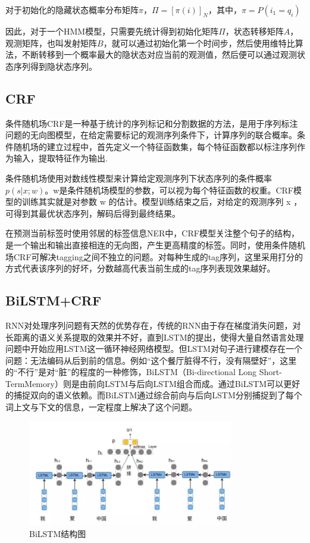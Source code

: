 \documentclass[a4paper, 12pt]{article}
\begin{document}
对于初始化的隐藏状态概率分布矩阵$\pi$，$\Pi = \left[ \pi(i) \right]_N$，其中，$\pi = P(i_1 = q_i)$

因此，对于一个HMM模型，只需要先统计得到初始化矩阵$\Pi$，状态转移矩阵$A$，观测矩阵，也叫发射矩阵$B$，就可以通过初始化第一个时间步，然后使用维特比算法，不断转移到一个概率最大的隐状态对应当前的观测值，然后便可以通过观测状态序列得到隐状态序列。


\subsection{CRF} %
\label{sub:crf}
条件随机场CRF是一种基于统计的序列标记和分割数据的方法，是用于序列标注问题的无向图模型，在给定需要标记的观测序列条件下，计算序列的联合概率。条件随机场的建立过程中，首先定义一个特征函数集，每个特征函数都以标注序列作为输入，提取特征作为输出.

条件随机场使用对数线性模型来计算给定观测序列下状态序列的条件概率$p(s|x;w)$。w是条件随机场模型的参数，可以视为每个特征函数的权重。CRF模型的训练其实就是对参数 w 的估计。模型训练结束之后，对给定的观测序列 x ，可得到其最优状态序列，解码后得到最终结果。

在预测当前标签时使用邻居的标签信息NER中，CRF模型关注整个句子的结构，是一个输出和输出直接相连的无向图，产生更高精度的标签。同时，使用条件随机场CRF可解决tagging之间不独立的问题。对每种生成的tag序列，这里采用打分的方式代表该序列的好坏，分数越高代表当前生成的tag序列表现效果越好。

\subsection{BiLSTM+CRF} %
\label{sub:bilstm}

RNN对处理序列问题有天然的优势存在，传统的RNN由于存在梯度消失问题，对长距离的语义关系提取的效果并不好，直到LSTM的提出，使得大量自然语言处理问题中开始应用LSTM这一循环神经网络模型。但LSTM对句子进行建模存在一个问题：无法编码从后到前的信息。例如“这个餐厅脏得不行，没有隔壁好”，这里的“不行”是对“脏”的程度的一种修饰，BiLSTM（Bi-directional Long Short-TermMemory）则是由前向LSTM与后向LSTM组合而成。通过BiLSTM可以更好的捕捉双向的语义依赖。而BiLSTM通过综合前向与后向LSTM分别捕捉到了每个词上文与下文的信息，一定程度上解决了这个问题。

\begin{figure}[htbp]
    \centering
    \includegraphics[width=0.8\textwidth]{BiLSTM}
    \caption{BiLSTM结构图}
    \label{fig:bilstm}
\end{figure}
\end{document}
